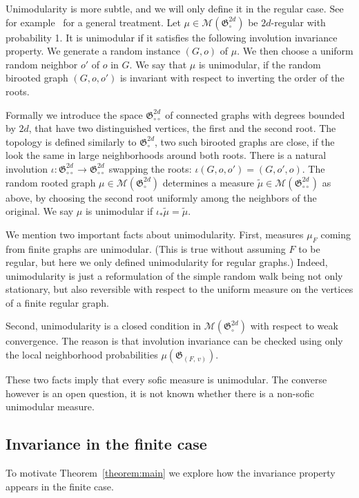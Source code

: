 \documentclass[11pt]{article}
\theoremstyle{definition}
\numberwithin{equation}{section}
\numberwithin{figure}{section}
\numberwithin{table}{section}
\newcommand{\clM}{\mathcal{M}}
\newcommand{\GoG}{\mathfrak{G}}
\begin{document}
Unimodularity is more subtle, and we will only define it in the regular case. See for example~\cite{lovasz2012large} for a general treatment. Let $\mu \in \clM(\GoG_{\circ}^{2d})$ be $2d$-regular with probability 1. It is unimodular if it satisfies the following involution invariance property. We generate a random instance $(G,o)$ of $\mu$. We then choose a uniform random neighbor $o'$ of $o$ in $G$. We say that $\mu$ is unimodular, if the random birooted graph $(G,o,o')$ is invariant with respect to inverting the order of the roots.

Formally we introduce the space $\GoG_{\circ\circ}^{2d}$ of connected graphs with degrees bounded by $2d$, that have two distinguished vertices, the first and the second root. The topology is defined similarly to $\GoG_{\circ}^{2d}$, two such birooted graphs are close, if the look the same in large neighborhoods around both roots. There is a natural involution $\iota: \GoG_{\circ\circ}^{2d} \to \GoG_{\circ\circ}^{2d}$ swapping the roots: $\iota (G,o,o') = (G,o',o)$. The random rooted graph $\mu \in \clM(\GoG_{\circ}^{2d})$ determines a measure $\widetilde{\mu} \in \clM(\GoG_{\circ\circ}^{2d})$ as above, by choosing the second root uniformly among the neighbors of the original. We say $\mu$ is unimodular if $\iota_{*}\widetilde{\mu}=\widetilde{\mu}$.

We mention two important facts about unimodularity. First, measures $\mu_F$ coming from finite graphs are unimodular. (This is true without assuming $F$ to be regular, but here we only defined unimodularity for regular graphs.) Indeed, unimodularity is just a reformulation of the simple random walk being not only stationary, but also reversible with respect to the uniform measure on the vertices of a finite regular graph.

Second, unimodularity is a closed condition in $\clM(\GoG_{\circ}^{2d})$ with respect to weak convergence. The reason is that involution invariance can be checked using only the local neighborhood probabilities $\mu(\GoG_{(F,\,v)})$.

These two facts imply that every sofic measure is unimodular. The converse however is an open question, it is not known whether there is a non-sofic unimodular measure.


\subsection{Invariance in the finite case}
To motivate Theorem~\ref{theorem:main} we explore how the invariance property appears in the finite case.
\end{document}
